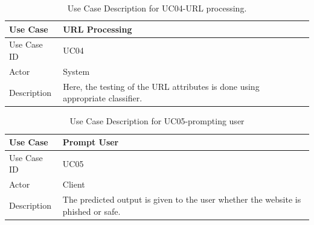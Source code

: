 \documentclass[12pt]{article}
\begin{document}

\pagestyle{fancy}
\renewcommand{\headrulewidth}{0pt}


\begin{table}[h]
\caption{Use Case Description for UC04-URL processing.}
\centering
\begin{tabular}{|p{3cm}|p{10cm}|}
\hline
    Use Case & URL Processing  \\
    \hline
    Use Case ID & UC04 \\
    \hline
    Actor & System \\
    \hline
    Description & Here, the testing of the URL attributes is done using appropriate classifier. \\
    \hline
\end{tabular}
\end{table}

\begin{table}[h]
\caption{Use Case Description for UC05-prompting user}
\centering
\begin{tabular}{|p{3cm}|p{10cm}|}
\hline
    Use Case & Prompt User  \\
    \hline
    Use Case ID & UC05 \\
    \hline
    Actor & Client \\
    \hline
    Description & The predicted output is given to the user whether the website is phished or safe. \\
    \hline
\end{tabular}
\end{table}
\end{document}
